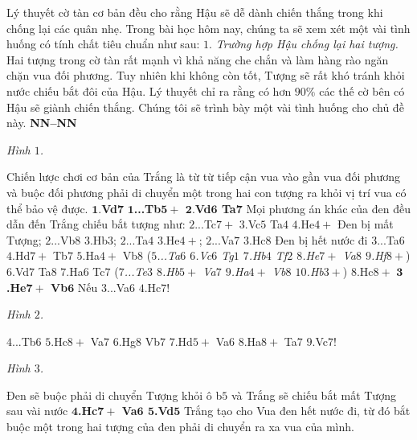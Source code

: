 \begin{multicols}{2}
	Lý thuyết cờ tàn cơ bản đều cho rằng Hậu sẽ dễ dành chiến thắng trong khi chống lại các quân nhẹ.
	\vskip 0.1cm
	Trong bài học hôm nay, chúng ta sẽ xem xét một vài tình huống có tính chất tiêu chuẩn như sau:
	\vskip 0.1cm
	$1.$ \textit{Trường hợp Hậu chống lại hai tượng.}
	\vskip 0.1cm 
	Hai tượng trong cờ tàn rất mạnh vì khả năng che chắn và làm hàng rào ngăn chặn vua đối phương. 
	\vskip 0.1cm
	Tuy nhiên khi không còn tốt, Tượng sẽ rất khó tránh khỏi nước chiếu bắt đôi của Hậu.
	\vskip 0.1cm
	Lý thuyết chỉ ra rằng có hơn $90\%$ các thế cờ bên có Hậu sẽ giành chiến thắng.
	Chúng tôi sẽ trình bày một vài tình huống cho chủ đề này.
	\vskip 0.1cm
	\textbf{\color{gocco}NN--NN}
	\begin{center}
		\newgame
		\scalebox{0.95}\showboard
		\vskip 0.1cm
		\textit{\small\color{gocco}Hình $1$.}
	\end{center}
	Chiến lược chơi cơ bản của Trắng là từ từ tiếp cận vua vào gần vua đối phương và buộc đối phương phải di chuyển một trong hai con tượng ra khỏi vị trí vua có thể bảo vệ được.
	\vskip 0.1cm
	$\pmb{1.}$\textbf{\color{gocco}Vd}$\pmb{7}$
	\vskip 0.1cm
	$\pmb{1}$\textbf{\color{gocco}...Tb$\pmb{5+}$ $\pmb{2.}$Vd$\pmb{6}$ Ta$\pmb{7}$} Mọi phương án khác của đen đều dẫn đến Trắng chiếu bắt tượng như:
	\vskip 0.1cm
	$2$...Tc$7+$ $3$.Vc$5$ Ta$4$ $4$.He$4+$ Đen bị mất Tượng; $2$...Vb$8$ $3$.Hb$3$; $2$...Ta$4$ $3$.He$4+$; $2$...Va$7$ $3$.Hc$8$ Đen bị hết nước đi $3$...Ta$6$ $4$.Hd$7+$ Tb$7$ $5$.Ha$4+$ Vb$8$ (\textit{$5$...Ta$6$ $6$.Vc$6$ Tg$1$ $7$.Hb$4$ Tf$2$ $8$.He$7+$ Va$8$ $9$.Hf$8+$}) $6$.Vd$7$ Ta$8$ $7$.Ha$6$ Tc$7$ (\textit{$7$...Te$3$ $8$.Hb$5+$ Va$7$ $9$.Ha$4+$ Vb$8$ $10$.Hb$3+$}) $8$.Hc$8+$
	\vskip 0.1cm
	$\pmb{3}$\textbf{\color{gocco}.He$\pmb{7+}$ Vb}$\pmb{6}$  Nếu $3$...Va$6$ $4$.Hc$7!$ 
	\begin{center}
		\newgame
		\scalebox{0.95}\showboard
		\vskip 0.1cm
		\textit{\small\color{gocco}Hình $2$.}
	\end{center}
	$4$...Tb$6$ $5$.Hc$8+$ Va$7$ $6$.Hg$8$ Vb$7$ $7$.Hd$5+$ Va$6$ $8$.Ha$8+$ Ta$7$ $9$.Vc$7!$ 
	\begin{center}
		\newgame
		\scalebox{0.95}\showboard
		\vskip 0.1cm
		\textit{\small\color{gocco}Hình $3$.}
	\end{center}
	Đen sẽ buộc phải di chuyển Tượng khỏi ô b$5$ và Trắng sẽ chiếu bắt mất Tượng sau vài nước
	\vskip 0.1cm
	$\pmb{4}$\textbf{\color{gocco}.Hc$\pmb{7+}$ Va$\pmb{6}$ $\pmb{5}$.Vd}$\pmb{5}$ Trắng tạo cho Vua đen hết nước đi, từ đó bắt buộc một trong hai tượng của đen phải di chuyển ra xa vua của mình.

\end{multicols}
